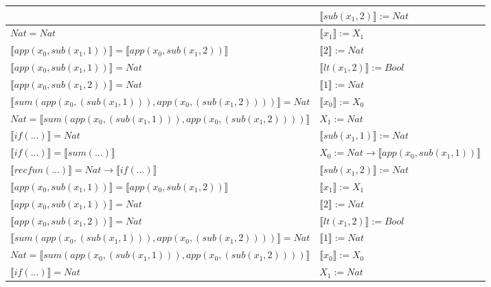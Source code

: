 \begin{exercise}
\begin{description}
\begin{center}
\begin{longtable}[!h]{ | l | l | }
                        & $ \llbracket sub(x_1,2) \rrbracket := Nat$ \\
                    \hline
                        $Nat = Nat$ & $ \llbracket x_1 \rrbracket := X_1$\\
		  $ \llbracket app(x_0, sub(x_1,1)) \rrbracket =  \llbracket app(x_0, sub(x_1,2)) \rrbracket$ & $ \llbracket 2 \rrbracket := Nat$\\
                        $ \llbracket app(x_0, sub(x_1,1)) \rrbracket = Nat$ &  $ \llbracket lt(x_1 , 2) \rrbracket := Bool$\\
                        $ \llbracket app(x_0, sub(x_1,2)) \rrbracket = Nat$ &  $ \llbracket 1 \rrbracket := Nat$\\
                        $ \llbracket sum(app(x_0, (sub(x_1,1))), app(x_0, (sub(x_1,2))))  \rrbracket = Nat$ &  $ \llbracket x_0 \rrbracket := X_0$\\
                        $Nat =  \llbracket sum(app(x_0, (sub(x_1,1))), app(x_0, (sub(x_1,2)))) \rrbracket$ & $X_1 := Nat$\\
                        $ \llbracket if(...) \rrbracket = Nat$ &  $ \llbracket sub(x_1,1) \rrbracket := Nat$ \\
                        $ \llbracket if(...) \rrbracket =  \llbracket sum(...) \rrbracket$ & $X_0 := Nat \to  \llbracket app(x_0, sub(x_1,1)) \rrbracket$\\
                        $ \llbracket recfun(...) \rrbracket =   Nat  \to  \llbracket if(...) \rrbracket $ & $ \llbracket sub(x_1,2) \rrbracket := Nat$ \\
                    \hline
	 	  $ \llbracket app(x_0, sub(x_1,1)) \rrbracket =  \llbracket app(x_0, sub(x_1,2)) \rrbracket$ &   $ \llbracket x_1 \rrbracket := X_1$\\ 
                        $ \llbracket app(x_0, sub(x_1,1)) \rrbracket = Nat$ & $ \llbracket 2 \rrbracket := Nat$\\ 
                        $ \llbracket app(x_0, sub(x_1,2)) \rrbracket = Nat$ & $ \llbracket lt(x_1 , 2) \rrbracket := Bool$\\
                        $ \llbracket sum(app(x_0, (sub(x_1,1))), app(x_0, (sub(x_1,2))))  \rrbracket = Nat$ &    $ \llbracket 1 \rrbracket := Nat$\\ 
                        $Nat =  \llbracket sum(app(x_0, (sub(x_1,1))), app(x_0, (sub(x_1,2)))) \rrbracket$ &  $ \llbracket x_0 \rrbracket := X_0$\\
                        $ \llbracket if(...) \rrbracket = Nat$ &  $X_1 := Nat$\\ 

\end{longtable}
\end{center}
\end{description}
\end{exercise}
